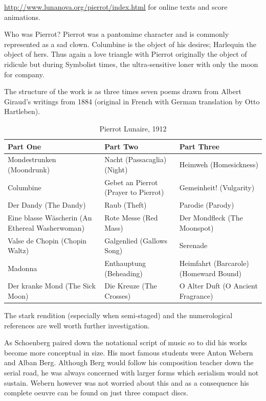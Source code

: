 \url{http://www.lunanova.org/pierrot/index.html} for online texts and score animations. 

Who was Pierrot? Pierrot was a pantomime character and is commonly represented as a sad clown. Columbine is the object of his desires; Harlequin the object of hers. Thus again a love triangle with Pierrot originally the object of ridicule but during Symbolist times, the ultra-sensitive loner with only the moon for company.  

The structure of the work is as three times seven poems drawn from Albert Giraud's writings from 1884 (original in French with German translation by Otto Hartleben).  

\begin{table}[h!]
\begin{tabular}{|p{5.0cm}|p{5.0cm}|p{5.0cm}|} \hline
\textbf{Part One} & \textbf{Part Two} & \textbf{Part Three} \\\hline
Mondestrunken (Moondrunk) & Nacht (Passacaglia) (Night) & Heimweh (Homesickness)\\\hline
Columbine & Gebet an Pierrot (Prayer to Pierrot) & Gemeinheit! (Vulgarity)\\\hline
Der Dandy (The Dandy) & Raub (Theft)  & Parodie (Parody)\\\hline
Eine blasse W\"ascherin (An Ethereal Washerwoman) &  Rote Messe (Red Mass) & Der Mondfleck (The Moonspot)\\\hline
Valse de Chopin (Chopin Waltz) & Galgenlied (Gallows Song)  & Serenade\\\hline
Madonna & Enthauptung (Beheading) & Heimfahrt (Barcarole) (Homeward Bound)\\\hline
Der kranke Mond (The Sick Moon) & Die Kreuze (The Crosses) & O Alter Duft (O Ancient Fragrance)\\\hline
\end{tabular}
\caption{Pierrot Lunaire, 1912}
\label{tab:pierrot}
\end{table}

The stark rendition (especially when semi-staged) and the numerological references are well worth further investigation. 

As Schoenberg paired down the notational script of music so to did his works become more conceptual in size. 
His most famous students were Anton Webern and Alban Berg. Although Berg would follow his composition teacher down the serial road, he was always concerned with larger forms which serialism would not sustain. Webern however was not worried about this and as a consequence his complete oeuvre can be found on just three compact discs. 


